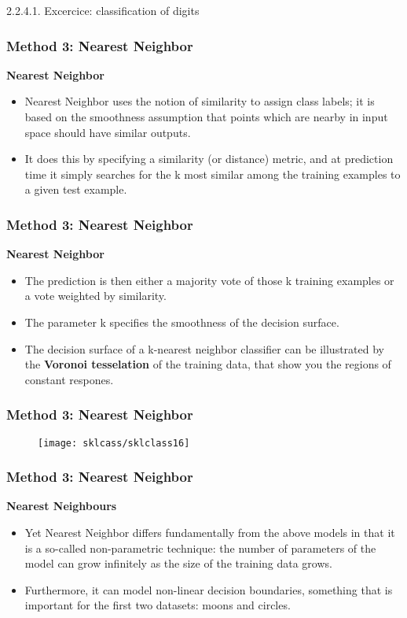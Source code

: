 2.2.4.1. Excercice: classification of digits\documentclass[MASTER.tex]{subfiles}
\begin{document}

	\frametitle{Method 3: Nearest Neighbor}
\Large
\textbf{Nearest Neighbor}
\begin{itemize}
\item Nearest Neighbor uses the notion of similarity to assign class labels; it is based on the smoothness assumption that points which are nearby in input space should have similar outputs.
\item  It does this by specifying a similarity (or distance) metric, and at prediction time it simply searches for the k most similar among the training examples to a given test example.
\end{itemize}



		\frametitle{Method 3: Nearest Neighbor}
	\Large
	\textbf{Nearest Neighbor}
	\begin{itemize} 
		\item The prediction is then either a majority vote of those k training examples or a vote weighted by similarity. \item The parameter k specifies the smoothness of the decision surface.\item  The decision surface of a k-nearest neighbor classifier can be illustrated by the \textbf{Voronoi tesselation} of the training data, that show you the regions of constant respones.
\end{itemize}


		\frametitle{Method 3: Nearest Neighbor}
	\begin{figure}
		\centering
		\texttt{[image: sklcass/sklclass16]}
	
	\end{figure}
	


		\frametitle{Method 3: Nearest Neighbor}
		\Large
	\textbf{Nearest Neighbours}
	\begin{itemize}
\item 	Yet Nearest Neighbor differs fundamentally from the above models in that it is a so-called non-parametric technique: the number of parameters of the model can grow infinitely as the size of the training data grows. 
\item Furthermore, it can model non-linear decision boundaries, something that is important for the first two datasets: moons and circles.
	\end{itemize}
\end{document}
